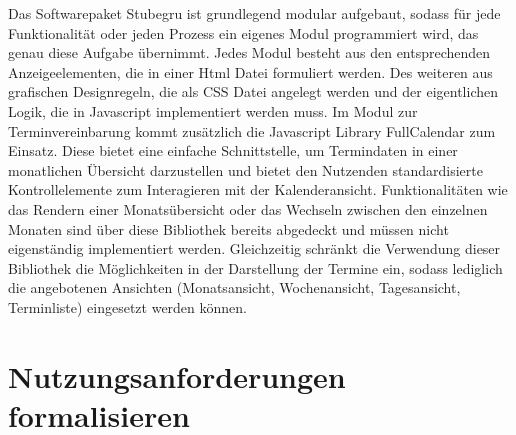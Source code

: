 Das Softwarepaket Stubegru ist grundlegend modular aufgebaut, sodass für jede
Funktionalität oder jeden Prozess ein eigenes Modul programmiert wird, das
genau diese Aufgabe übernimmt. Jedes Modul besteht aus den entsprechenden
Anzeigeelementen, die in einer Html Datei formuliert werden. Des weiteren aus
grafischen Designregeln, die als CSS Datei angelegt werden und der eigentlichen
Logik, die in Javascript implementiert werden muss. Im Modul zur
Terminvereinbarung kommt zusätzlich die Javascript Library \gls{FullCalendar}
zum Einsatz. Diese bietet eine einfache Schnittstelle, um Termindaten in einer
monatlichen Übersicht darzustellen und bietet den Nutzenden standardisierte
Kontrollelemente zum Interagieren mit der Kalenderansicht. Funktionalitäten wie
das Rendern einer Monatsübersicht oder das Wechseln zwischen den einzelnen
Monaten sind über diese Bibliothek bereits abgedeckt und müssen nicht
eigenständig implementiert werden. Gleichzeitig schränkt die Verwendung dieser
Bibliothek die Möglichkeiten in der Darstellung der Termine ein, sodass
lediglich die angebotenen Ansichten (Monatsansicht, Wochenansicht,
Tagesansicht, Terminliste) eingesetzt werden können.

\section{Nutzungsanforderungen formalisieren}
\label{subsection:sequenceDiagrams}

